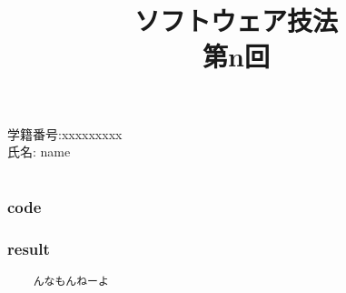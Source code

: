 \documentclass{article}
\title{\rm ソフトウェア技法 \\ 第n回}
\date{}
\begin{document}
\maketitle

\begin{description}
	\item[\rm \large 学籍番号:xxxxxxxxx]
	\item[\rm \large 氏名: name]
\end{description}

\section{}
\subsection{}
\subsubsection*{code}
\subsubsection*{result}
\begin{lstlisting}
	んなもんねーよ
\end{lstlisting}
\end{document}
